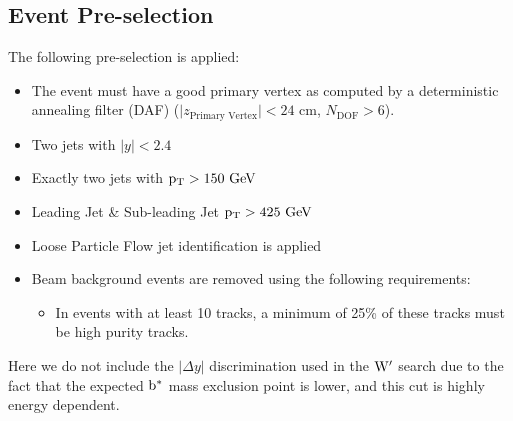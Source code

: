 

\subsection{Event Pre-selection}
\label{sec:bspre-selection}
The following pre-selection is applied:

\begin{itemize}
\item The event must have a good primary vertex as computed by a deterministic annealing filter (DAF)
($\vert z_\text{Primary Vertex}\vert < 24$ cm, $N_\text{DOF} > 6$).
\item Two jets with $|y| < 2.4$
\item Exactly two jets with $\mathrm{p_{T}} > 150~\mathrm{GeV}$
\item Leading Jet \& Sub-leading Jet $\mathrm{p_{T}} > 425~\mathrm{GeV}$
\item Loose Particle Flow jet identification \cite{jetid} is applied
\item Beam background events are removed using the following requirements:
        \begin{itemize}
        \item In events with at least 10 tracks, a minimum of 25\% of
          these tracks must be high purity tracks.
        \end{itemize}
\end{itemize}

Here we do not include the $|\Delta y|$ discrimination used in the $\mathrm{W}^{\prime}$ search due to the fact that the expected 
$\mathrm{b}^{*}$ mass exclusion point is lower, and this cut is highly energy dependent.  




